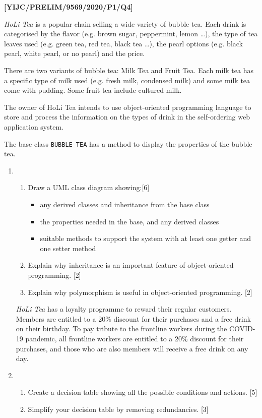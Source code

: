 \item \textbf{{[}YIJC/PRELIM/9569/2020/P1/Q4{]} }

\emph{HoLi Tea} is a popular chain selling a wide variety of bubble
tea. Each drink is categorised by the flavor (e.g. brown sugar, peppermint,
lemon \dots ), the type of tea leaves used (e.g. green tea, red tea,
black tea \dots ), the pearl options (e.g. black pearl, white pearl,
or no pearl) and the price. 

There are two variants of bubble tea: Milk Tea and Fruit Tea. Each
milk tea has a specific type of milk used (e.g. fresh milk, condensed
milk) and some milk tea come with pudding. Some fruit tea include
cultured milk. 

The owner of HoLi Tea intends to use object-oriented programming language
to store and process the information on the types of drink in the
self-ordering web application system. 

The base class \texttt{BUBBLE\_TEA} has a method to display the properties
of the bubble tea. 
\begin{enumerate}
\item {}
\begin{enumerate}
\item Draw a UML class diagram showing:\hfill{}{[}6{]}
\begin{itemize}
\item any derived classes and inheritance from the base class 
\item the properties needed in the base, and any derived classes 
\item suitable methods to support the system with at least one getter and
one setter method
\end{itemize}
\item Explain why inheritance is an important feature of object-oriented
programming.\hfill{} {[}2{]}
\item Explain why polymorphism is useful in object-oriented programming.
\hfill{}{[}2{]}
\end{enumerate}
\emph{HoLi Tea} has a loyalty programme to reward their regular customers.
Members are entitled to a 20\% discount for their purchases and a
free drink on their birthday. To pay tribute to the frontline workers
during the COVID-19 pandemic, all frontline workers are entitled to
a 20\% discount for their purchases, and those who are also members
will receive a free drink on any day. 
\item {}
\begin{enumerate}
\item Create a decision table showing all the possible conditions and actions.
\hfill{}{[}5{]}
\item Simplify your decision table by removing redundancies. \hfill{}{[}3{]}
\end{enumerate}
\end{enumerate}